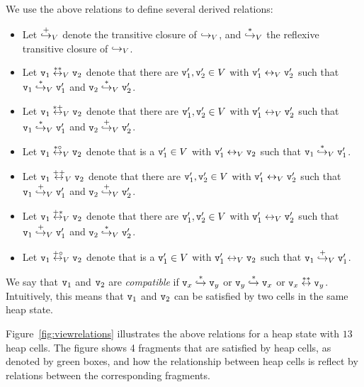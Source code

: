 We use the above relations to define several derived relations:
\begin{itemize}
\item Let $\overset{+}\hookrightarrow_{V}$ denote the transitive closure of
  $\hookrightarrow_{V}$, and
   $\overset{*}\hookrightarrow_{V}$ the reflexive transitive closure of
$\hookrightarrow_{V}$.
\item Let $\mathtt{v}_1  \overset{**}\leftrightarrow_{V}  \mathtt{v}_2$ denote that there are
  $\mathtt{v}_1',\mathtt{v}_2' \in V$ with $\mathtt{v}_1' \leftrightarrow_{V} \mathtt{v}_2'$ such that
  $\mathtt{v}_1  \overset{*}\hookrightarrow_{V} \mathtt{v}_1'$ and $\mathtt{v}_2  \overset{*}\hookrightarrow_{V} \mathtt{v}_2'$.
\item Let $\mathtt{v}_1  \overset{*+}\leftrightarrow_{V}  \mathtt{v}_2$ denote that there are
  $\mathtt{v}_1', \mathtt{v}_2' \in V$ with $\mathtt{v}_1' \leftrightarrow_{V} \mathtt{v}_2'$ such that
  $\mathtt{v}_1  \overset{*}\hookrightarrow_{V} \mathtt{v}_1'$ and $\mathtt{v}_2  \overset{+}\hookrightarrow_{V} \mathtt{v}_2'$.
\item Let $\mathtt{v}_1  \overset{*\circ}\leftrightarrow_{V}  \mathtt{v}_2$ denote that is a
  $\mathtt{v}_1' \in V$ with $\mathtt{v}_1' \leftrightarrow_{V} \mathtt{v}_2$ such that
  $\mathtt{v}_1  \overset{*}\hookrightarrow_{V} \mathtt{v}_1'$.
\item Let $\mathtt{v}_1  \overset{++}\leftrightarrow_{V}  \mathtt{v}_2$ denote that there are
  $\mathtt{v}_1',\mathtt{v}_2' \in V$ with $\mathtt{v}_1' \leftrightarrow_{V} \mathtt{v}_2'$ such that
  $\mathtt{v}_1  \overset{+}\hookrightarrow_{V} \mathtt{v}_1'$ and $\mathtt{v}_2  \overset{+}\hookrightarrow_{V} \mathtt{v}_2'$.
\item Let $\mathtt{v}_1  \overset{+*}\leftrightarrow_{V}  \mathtt{v}_2$ denote that there are
  $\mathtt{v}_1', \mathtt{v}_2' \in V$ with $\mathtt{v}_1' \leftrightarrow_{V} \mathtt{v}_2'$ such that
  $\mathtt{v}_1  \overset{+}\hookrightarrow_{V} \mathtt{v}_1'$ and $\mathtt{v}_2  \overset{*}\hookrightarrow_{V} \mathtt{v}_2'$.
\item Let $\mathtt{v}_1  \overset{+\circ}\leftrightarrow_{V}  \mathtt{v}_2$ denote that is a
  $\mathtt{v}_1' \in V$ with $\mathtt{v}_1' \leftrightarrow_{V} \mathtt{v}_2$ such that
  $\mathtt{v}_1  \overset{+}\hookrightarrow_{V} \mathtt{v}_1'$.
\end{itemize}
We say that $\mathtt{v}_1$ and $\mathtt{v}_2$ are {\em compatible} if $\mathtt{v}_x \overset{*}\hookrightarrow \mathtt{v}_y$ or $\mathtt{v}_y \overset{*}\hookrightarrow \mathtt{v}_x$ or $\mathtt{v}_x \overset{**}\leftrightarrow \mathtt{v}_y$. Intuitively, this means that $\mathtt{v}_1$ and
$\mathtt{v}_2$ can be satisfied by two cells in the same heap state.

Figure~\ref{fig:viewrelations} illustrates the above relations for a heap state
with $13$ heap cells. The figure shows 4 fragments that are satisfied by heap
cells, as denoted by green boxes, and how the relationship between heap cells
is reflect by relations between the corresponding fragments.

